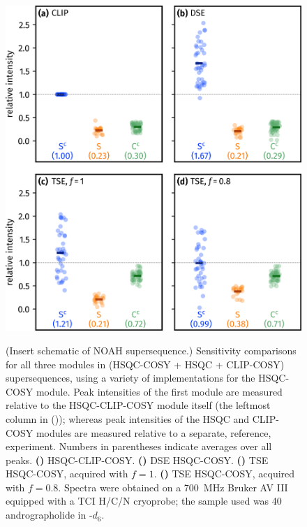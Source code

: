 \documentclass[a4paper,12pt]{article}
\newcommand{\todo}[1]{{\color{OrangeRed}#1}}
\newcommand{\andro}{Spectra were obtained on a \SI{700}{\MHz} Bruker AV III equipped with a TCI H/C/N cryoprobe; the sample used was \SI{40}{\milli\molar} andrographolide in \ch{DMSO}-$d_6$.}
\begin{document}
\begin{refsection}
\begin{figure}[!ht]
    \centering
    \includegraphics[]{hsqccosy_sens.png}%
    {\label{fig:hsqccosy_sens_clip}}%
    {\label{fig:hsqccosy_sens_dse}}%
    {\label{fig:hsqccosy_sens_tse_1}}%
    {\label{fig:hsqccosy_sens_tse_0p8}}%
    \caption[Sensitivity comparisons for  supersequences]{
        \todo{(Insert schematic of NOAH supersequence.)}
        Sensitivity comparisons for all three modules in  (HSQC-COSY + HSQC + CLIP-COSY) supersequences, using a variety of implementations for the HSQC-COSY module.
        Peak intensities of the first module are measured relative to the HSQC-CLIP-COSY module itself (the leftmost column in ()); whereas peak intensities of the HSQC and CLIP-COSY modules are measured relative to a separate, reference,  experiment.
        Numbers in parentheses indicate averages over all peaks.
        \textbf{()} HSQC-CLIP-COSY.
        \textbf{()} DSE HSQC-COSY.
        \textbf{()} TSE HSQC-COSY, acquired with $f = 1$.
        \textbf{()} TSE HSQC-COSY, acquired with $f = 0.8$.
        \andro{}
    }
    \label{fig:hsqccosy_sens}
\end{figure}


\end{refsection}
\end{document}
